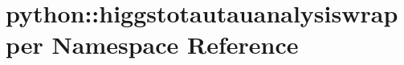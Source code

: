 \hypertarget{namespacepython_1_1higgstotautauanalysiswrapper}{
\section{python::higgstotautauanalysiswrapper Namespace Reference}
\label{namespacepython_1_1higgstotautauanalysiswrapper}
}
